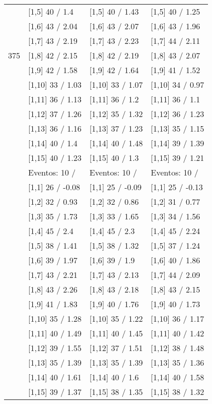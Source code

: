 \begin{table}
\begin{tabular}[t]{llll}
 & {}[1,5] 40  / 1.4 & {}[1,5] 40  / 1.43 & {}[1,5] 40  / 1.25\\
 & {}[1,6] 43  / 2.04 & {}[1,6] 43  / 2.07 & {}[1,6] 43  / 1.96\\
 & {}[1,7] 43  / 2.19 & {}[1,7] 43  / 2.23 & {}[1,7] 44  / 2.11\\
375 & {}[1,8] 42  / 2.15 & {}[1,8] 42  / 2.19 & {}[1,8] 43  / 2.07\\
\addlinespace
 & {}[1,9] 42  / 1.58 & {}[1,9] 42  / 1.64 & {}[1,9] 41  / 1.52\\
 & {}[1,10] 33  / 1.03 & {}[1,10] 33  / 1.07 & {}[1,10] 34  / 0.97\\
 & {}[1,11] 36  / 1.13 & {}[1,11] 36  / 1.2 & {}[1,11] 36  / 1.1\\
 & {}[1,12] 37  / 1.26 & {}[1,12] 35  / 1.32 & {}[1,12] 36  / 1.23\\
 & {}[1,13] 36  / 1.16 & {}[1,13] 37  / 1.23 & {}[1,13] 35  / 1.15\\
\addlinespace
 & {}[1,14] 40  / 1.4 & {}[1,14] 40  / 1.48 & {}[1,14] 39  / 1.39\\
 & {}[1,15] 40  / 1.23 & {}[1,15] 40  / 1.3 & {}[1,15] 39  / 1.21\\
 & Eventos:  10 / & Eventos:  10 / & Eventos:  10 /\\
 & {}[1,1] 26  / -0.08 & {}[1,1] 25  / -0.09 & {}[1,1] 25  / -0.13\\
 & {}[1,2] 32  / 0.93 & {}[1,2] 32  / 0.86 & {}[1,2] 31  / 0.77\\
\addlinespace
 & {}[1,3] 35  / 1.73 & {}[1,3] 33  / 1.65 & {}[1,3] 34  / 1.56\\
 & {}[1,4] 45  / 2.4 & {}[1,4] 45  / 2.3 & {}[1,4] 45  / 2.24\\
 & {}[1,5] 38  / 1.41 & {}[1,5] 38  / 1.32 & {}[1,5] 37  / 1.24\\
 & {}[1,6] 39  / 1.97 & {}[1,6] 39  / 1.9 & {}[1,6] 40  / 1.86\\
 & {}[1,7] 43  / 2.21 & {}[1,7] 43  / 2.13 & {}[1,7] 44  / 2.09\\
\addlinespace
500 & {}[1,8] 43  / 2.26 & {}[1,8] 43  / 2.18 & {}[1,8] 43  / 2.15\\
 & {}[1,9] 41  / 1.83 & {}[1,9] 40  / 1.76 & {}[1,9] 40  / 1.73\\
 & {}[1,10] 35  / 1.28 & {}[1,10] 35  / 1.22 & {}[1,10] 36  / 1.17\\
 & {}[1,11] 40  / 1.49 & {}[1,11] 40  / 1.45 & {}[1,11] 40  / 1.42\\
 & {}[1,12] 39  / 1.55 & {}[1,12] 37  / 1.51 & {}[1,12] 38  / 1.48\\
\addlinespace
 & {}[1,13] 35  / 1.39 & {}[1,13] 35  / 1.39 & {}[1,13] 35  / 1.36\\
 & {}[1,14] 40  / 1.61 & {}[1,14] 40  / 1.6 & {}[1,14] 40  / 1.58\\
 & {}[1,15] 39  / 1.37 & {}[1,15] 38  / 1.35 & {}[1,15] 38  / 1.32\\
\bottomrule
\end{tabular}
\end{table}

